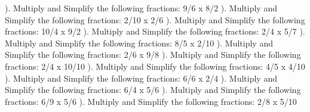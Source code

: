 \documentclass{article}%
\begin{document}
\newline%
\newline%
). Multiply and Simplify the following fractions: 9/6 x 8/2%
\newline%
\newline%
). Multiply and Simplify the following fractions: 2/10 x 2/6%
\newline%
\newline%
). Multiply and Simplify the following fractions: 10/4 x 9/2%
\newline%
\newline%
). Multiply and Simplify the following fractions: 2/4 x 5/7%
\newline%
\newline%
). Multiply and Simplify the following fractions: 8/5 x 2/10%
\newline%
\newline%
). Multiply and Simplify the following fractions: 2/6 x 9/8%
\newline%
\newline%
). Multiply and Simplify the following fractions: 2/4 x 10/10%
\newline%
\newline%
). Multiply and Simplify the following fractions: 4/5 x 4/10%
\newline%
\newline%
). Multiply and Simplify the following fractions: 6/6 x 2/4%
\newline%
\newline%
). Multiply and Simplify the following fractions: 6/4 x 5/6%
\newline%
\newline%
). Multiply and Simplify the following fractions: 6/9 x 5/6%
\newline%
\newline%
). Multiply and Simplify the following fractions: 2/8 x 5/10%
\newline%
\end{document}
